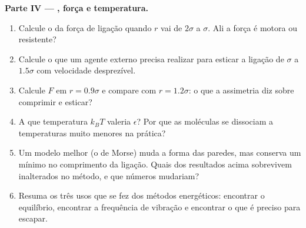 \begin{problem}
\medskip
\noindent\textbf{Parte IV --- , força e temperatura.}
\begin{enumerate}[resume]
  \item Calcule o  da força de ligação quando $r$ vai de $2\sigma$
        a $\sigma$. Ali a força é motora ou resistente?
  \item Calcule o  que um agente externo precisa realizar para esticar a ligação
        de $\sigma$ a $1.5\sigma$ com velocidade desprezível.
  \item Calcule $F$ em $r = 0.9\sigma$ e compare com $r = 1.2\sigma$:
        o que a assimetria diz sobre comprimir e esticar?
  \item A que temperatura $k_BT$ valeria $\epsilon$? Por que as
        moléculas se dissociam a temperaturas muito menores na prática?
  \item Um modelo melhor (o de Morse) muda a forma das paredes, mas conserva
        um mínimo no comprimento da ligação. Quais dos resultados acima sobrevivem
        inalterados no método, e que números mudariam?
  \item Resuma os três usos que se fez dos métodos energéticos: encontrar o
        equilíbrio, encontrar a frequência de vibração e encontrar o que
        é preciso para escapar.
\end{enumerate}
\end{problem}
